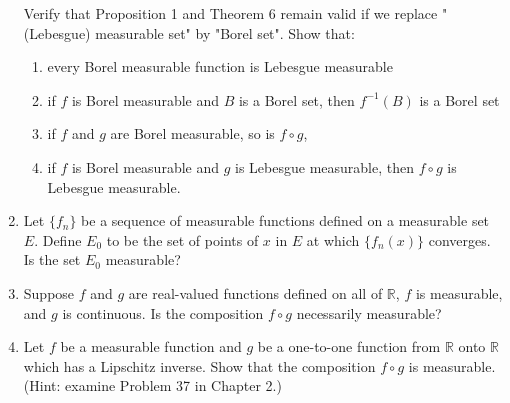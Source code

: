 \begin{enumerate}
    Verify that Proposition 1 and Theorem 6 remain valid if we replace "(Lebesgue) measurable set" by "Borel set".
    Show that:
    \begin{enumerate}[label=(\roman*),align=left]
        \item every Borel measurable function is Lebesgue measurable
        \item if $f$ is Borel measurable and $B$ is a Borel set, then $f^{-1}(B)$ is a Borel set
        \item if $f$ and $g$ are Borel measurable, so is $f\circ g$, 
        \item if $f$ is Borel measurable and $g$ is Lebesgue measurable, then $f\circ g$ is Lebesgue measurable.
    \end{enumerate}
    \item Let $\{f_n\}$ be a sequence of measurable functions defined on a measurable set $E$.
    Define $E_0$ to be the set of points of $x$ in $E$ at which $\{f_n(x)\}$ converges. Is the set $E_0$ measurable?
    \item Suppose $f$ and $g$ are real-valued functions defined on all of $\mathbb{R}$, $f$ is measurable, and $g$ is continuous.
    Is the composition $f\circ g$ necessarily measurable?
    \item Let $f$ be a measurable function and $g$ be a one-to-one function from $\mathbb{R}$ onto $\mathbb{R}$ which has a Lipschitz inverse. Show that the composition $f\circ g$ is measurable. (Hint: examine Problem 37 in Chapter 2.)
\end{enumerate}

